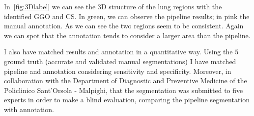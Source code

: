 \documentclass{standalone}
\begin{document}
	In \figurename\,\ref{fig:3Dlabel} we can see the 3D structure of the lung regions with the identified GGO and CS. In green, we can observe the pipeline results; in pink the manual annotation. As we can see the two regions seem to be consistent. Again we can spot that the annotation tends to consider a larger area than the pipeline.

	I also have matched results and annotation in a quantitative way. Using the $5$ ground truth (accurate and validated manual segmentations) I have matched pipeline and annotation considering sensitivity and specificity.
	Moreover, in collaboration with the Department of Diagnostic and Preventive Medicine of the Policlinico Sant'Orsola - Malpighi, that the segmentation was submitted to five experts in order to make a blind evaluation, comparing the pipeline segmentation with annotation. 
	
\end{document}
